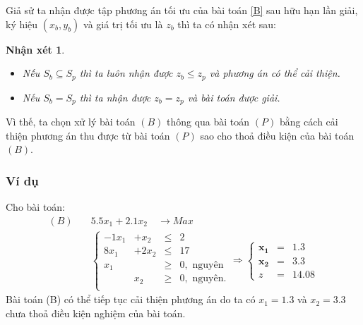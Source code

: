 \documentclass[12pt,a4paper]{report}
\newtheorem{nx}{Nhận xét}
\begin{document}
Giả sử ta nhận được tập phương án tối ưu của bài toán \eqref{B} sau hữu hạn lần giải, ký hiệu $(x_b, y_b)$ và giá trị tối ưu là $z_b$ thì ta có nhận xét sau:
\begin{nx} \label{nx}
\phantom{abc}
\begin{itemize}
\item Nếu $S_b \subseteq S_p$ thì ta luôn nhận được $z_b \leq z_p$ và phương án có thể cải thiện.
\item Nếu $S_b = S_p$ thì ta nhận được $z_b = z_p$ và bài toán được giải.
\end{itemize}    
\end{nx}
Vì thế, ta chọn xử lý bài toán $(B)$ thông qua bài toán $(P)$ bằng cách cải thiện phương án thu được từ bài toán $(P)$ sao cho thoả điều kiện của bài toán $(B)$.

\subsubsection*{Ví dụ}
Cho bài toán:
        \begin{equation} \label{baitoannguyenloi}
        \begin{split}
            (B) \quad & 5.5x_1 + 2.1x_2 \quad \longrightarrow Max \\
            & \left\{\begin{array} {cccc}
            -1x_1 &+ x_2 &\leq& 2 \\
            8x_1 &+ 2x_2 &\leq& 17 \\
            x_1 &&\geq & 0, \text{ nguyên} \\
            &x_2 &\geq& 0, \text{ nguyên}. \\
            \end{array}\right.
            \Longrightarrow
            \left\{\begin{array} {ccc}
            \mathbf{x_1} & \mathbf{=}& \mathbf{1.3} \\
            \mathbf{x_2} &\mathbf{=}& \mathbf{3.3} \\
            z &=&14.08
        \end{array}\right.
        \end{split}
        \end{equation}
    Bài toán (B) có thể tiếp tục cải thiện phương án do ta có $x_1=1.3$ và $x_2=3.3$ chưa thoả điều kiện nghiệm của bài toán.
\end{document}
